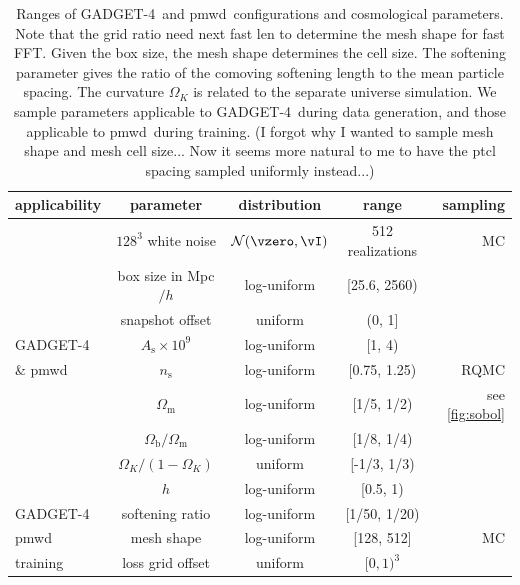 \documentclass[modern, trackchanges, dvipsnames]{aastex631}
\newcommand{\pmwd}{{\usefont{T1}{nova}{m}{sl}pmwd}}
\newcommand{\GADGET}{{{\fontsize{10pt}{12pt}\selectfont GADGET}-4}}
\newcommand{\As}{A_\mathrm{s}}
\newcommand{\ns}{n_\mathrm{s}}
\newcommand{\Omegam}{\Omega_\mathrm{m}}
\newcommand{\Omegab}{\Omega_\mathrm{b}}
\newcommand{\OmegaK}{\Omega_K}
\newcommand{\YL}[1]{\textcolor{Bittersweet}{#1}}
\begin{document}
\begin{table}
  \centering
  \caption{Ranges of \GADGET\ and \pmwd\ configurations and cosmological
  parameters.
  Note that the grid ratio need next fast len to determine the mesh shape
  for fast FFT.
  Given the box size, the mesh shape determines the cell size.
  The softening parameter gives the ratio of the comoving softening length
  to the mean particle spacing.
  The curvature $\OmegaK$ is related to the separate universe simulation.
  We sample parameters applicable to \GADGET\ during data generation, and
  those applicable to \pmwd\ during training.
  \YL{(I forgot why I wanted to sample mesh shape and mesh cell size...
  Now it seems more natural to me to have the ptcl spacing sampled
  uniformly instead...)}
  }
  \label{tab:param}
  \begin{tabular}{lcccr}
  \toprule
  applicability & parameter & distribution & range & sampling \\
  \midrule
  & $128^3$ white noise & $\mathcal{N}(\vzero, \vI)$ & 512 realizations & MC \\
  \cmidrule(lr){2-5}
  & box size in Mpc$/h$ & \YL{log-uniform} & [25.6, 2560) \\
  \cmidrule(lr){2-4}
  & snapshot offset & uniform & (0, 1] \\
  \cmidrule(lr){2-4}
  \GADGET\ & $\As \times 10^9$ & log-uniform & [1, 4) \\
  \cmidrule(lr){2-4}
  \& \pmwd\ & $\ns$ & log-uniform & [0.75, 1.25) & RQMC \\
  \cmidrule(lr){2-4}
  & $\Omegam$ & log-uniform & [1/5, 1/2) & see \autoref{fig:sobol} \\
  \cmidrule(lr){2-4}
  & $\Omegab / \Omegam$ & log-uniform & [1/8, 1/4) \\
  \cmidrule(lr){2-4}
  & $\OmegaK / (1 - \OmegaK)$ & uniform & [-1/3, 1/3) \\
  \cmidrule(lr){2-4}
  & $h$ & log-uniform & [0.5, 1) \\
  \cmidrule(lr){1-4}
  \GADGET\ & softening ratio & log-uniform & [1/50, 1/20) \\
  \cmidrule(lr){1-5}
  \pmwd\ & mesh shape & log-uniform & [128, 512] & MC \\
  \cmidrule(lr){2-4}
  \cmidrule(lr){1-4}
  training & loss grid offset & uniform & $[0, 1)^3$ \\
  \bottomrule
  \end{tabular}
  \end{table}
\end{document}
